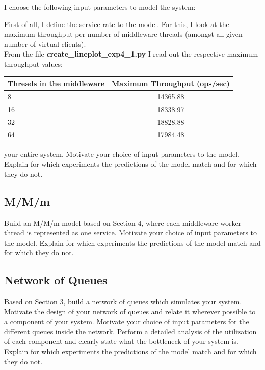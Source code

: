 \documentclass[11pt,a4paper]{article}
\begin{document}
I choose the following input parameters to model the system:

First of all, I define the service rate to the model. 
For this, I look at the maximum throughput per number of middleware threads (amongst all given number of virtual clients). \\
From the file \textbf{create\_lineplot\_exp4\_1.py} I read out the respective maximum throughput values: \\

\begin{center}
	\scriptsize{
		\begin{tabular}{|l|c|}
			\hline Threads in the middleware & Maximum Throughput (ops/sec)                                     \\ 
			\hline 8 &   14365.88 \\ 
			\hline 16 &  18338.97 \\ 
			\hline 32 &  18828.88 \\
			\hline 64 &  17984.48 \\
			\hline
		\end{tabular}
	} 
\end{center}


your entire system. Motivate your choice of input parameters to the model. Explain for which experiments the predictions of the model match and for which they do not.

\subsection{M/M/m}

Build an M/M/m model based on Section 4, where each middleware worker thread is represented as one service.  Motivate your choice of input parameters to the model. Explain for which experiments the predictions of the model match and for which they do not.

\subsection{Network of Queues}

Based on Section 3, build a network of queues which simulates your system. Motivate the design of your network of queues and relate it wherever possible to a component of your system. Motivate your choice of input parameters for the different queues inside the network. Perform a detailed analysis of the utilization of each component and clearly state what the bottleneck of your system is. Explain for which experiments the predictions of the model match and for which they do not.
\end{document}
